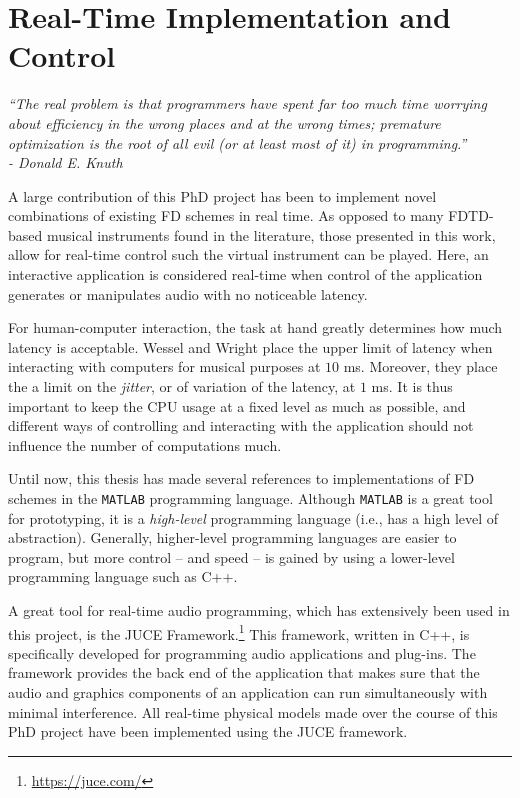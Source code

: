 \chapter{Real-Time Implementation and Control}\label{ch:realtime}

\begin{flushright}{\it
    ``The real problem is that programmers have spent far too much time worrying \\
    about efficiency in the wrong places and at the wrong times; premature\\
    optimization is the root of all evil (or at least most of it) in programming.''\\
    - Donald E. Knuth}
\end{flushright}
%
\vspace{2em}
\noindent A large contribution of this PhD project has been to implement novel combinations of existing FD schemes in real time. As opposed to many FDTD-based musical instruments found in the literature, those presented in this work, allow for real-time control such the virtual instrument can be played. Here, an interactive application is considered real-time when control of the application generates or manipulates audio with no noticeable latency.

For human-computer interaction, the task at hand greatly determines how much latency is acceptable. Wessel and Wright \cite{Wessel2002} place the upper limit of latency when interacting with computers for musical purposes at $10$ ms. Moreover, they place the a limit on the \textit{jitter}, or of variation of the latency, at $1$ ms. It is thus important to keep the CPU usage at a fixed level as much as possible, and different ways of controlling and interacting with the application should not influence the number of computations much.

Until now, this thesis has made several references to implementations of FD schemes in the \texttt{MATLAB} programming language.
Although \texttt{MATLAB} is a great tool for prototyping, it is a \textit{high-level} programming language (i.e., has a high level of abstraction). Generally, higher-level programming languages are easier to program, but more control -- and speed -- is gained by using a lower-level programming language such as C++.


A great tool for real-time audio programming, which has extensively been used in this project, is the JUCE Framework.\footnote{\url{https://juce.com/}} This framework, written in C++, is specifically developed for programming audio applications and plug-ins. The framework provides the back end of the application that makes sure that the audio and graphics components of an application can run simultaneously with minimal interference. All real-time physical models made over the course of this PhD project have been implemented using the JUCE framework. 

